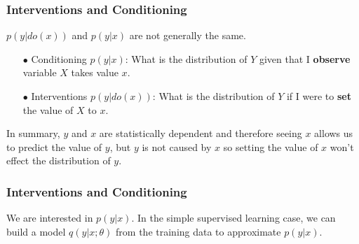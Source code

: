 \documentclass{beamer}
\begin{document}
\begin{frame}
    \frametitle{Interventions and Conditioning}
    $p(y|do(x))$ and $p(y|x)$ are not generally the same. 
    \begin{itemize}
        \item[$\bullet$] Conditioning $p(y|x)$: What is the distribution of $Y$ given that I \textbf{observe} 
        variable $X$ takes value $x$.
        \item[$\bullet$] Interventions $p(y|do(x))$: What is the distribution of $Y$ if I were to \textbf{set} 
        the value of $X$ to $x$. 
    \end{itemize}
    In summary, $y$ and $x$ are statistically dependent and therefore seeing $x$ allows us to predict the value 
    of $y$, but $y$ is not caused by $x$ so setting the value of $x$ won't effect the distribution of $y$. 
\end{frame}

\begin{frame}
    \frametitle{Interventions and Conditioning} 
    We are interested in $p(y|x)$. In the simple supervised learning case, we can build a model $q(y|x;\theta)$ from the 
    training data to approximate $p(y|x)$. \\
\end{frame}
\end{document}
